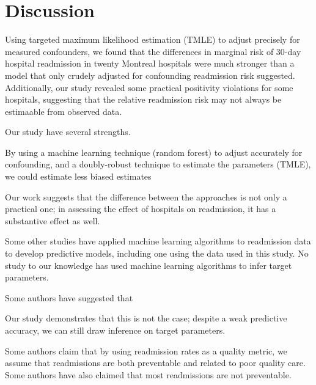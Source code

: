 \documentclass[]{article}\usepackage[]{graphicx}\usepackage[]{color}
\begin{document}
\section{Discussion}
Using targeted maximum likelihood estimation (TMLE) to adjust precisely for measured confounders, we found that the differences in marginal risk of 30-day hospital readmission in twenty Montreal hospitals were much stronger than a model that only crudely adjusted for confounding readmission risk suggested. Additionally, our study revealed some practical positivity violations for some hospitals, suggesting that the relative readmission risk may not always be estimaable from observed data.

Our study have several strengths.

By using a machine learning technique (random forest) to adjust accurately for confounding, and a doubly-robust technique to estimate the parameters (TMLE), we could estimate less biased estimates 


Our work suggests that the difference between the approaches is not only a practical one; in assessing the effect of hospitals on readmission, it has a substantive effect as well.

Some other studies have applied machine learning algorithms to readmission data to develop predictive models, including one using the data used in this study. No study to our knowledge has used machine learning algorithms to infer target parameters. 

Some authors  have suggested that 

Our study demonstrates that this is not the case; despite a weak predictive accuracy, we can still draw inference on target parameters.


Some authors \supercite{kansagara_risk_2011} claim that by using readmission rates as a quality metric, we assume that readmissions are both preventable and related to poor quality care. 
Some authors \supercite{joynt_thirty-day_2012} have also claimed that most readmissions are not preventable.
\end{document}
